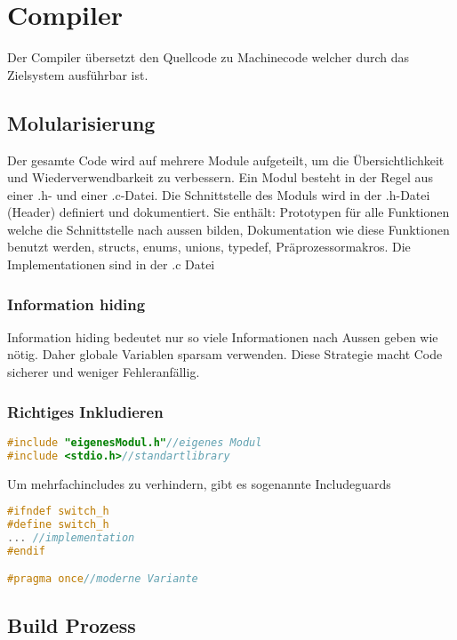 \section{Compiler}
Der Compiler übersetzt den Quellcode zu Machinecode welcher durch das Zielsystem ausführbar ist.
\subsection{Molularisierung}

Der gesamte Code wird auf mehrere Module aufgeteilt, um die Übersichtlichkeit und Wiederverwendbarkeit zu verbessern. Ein Modul besteht in der Regel aus einer .h- und einer .c-Datei.\newline
Die Schnittstelle des Moduls wird in der .h-Datei (Header) definiert und dokumentiert. Sie enthält: Prototypen für alle Funktionen welche die Schnittstelle nach aussen bilden, Dokumentation wie diese Funktionen benutzt werden, structs, enums, unions, typedef, Präprozessormakros. Die Implementationen sind in der .c Datei

\subsubsection{Information hiding}

Information hiding bedeutet nur so viele Informationen nach Aussen geben wie nötig. Daher globale Variablen sparsam verwenden. Diese Strategie macht Code sicherer und weniger Fehleranfällig.

\subsubsection{Richtiges Inkludieren}

\begin{lstlisting}[language = c]
#include "eigenesModul.h"//eigenes Modul
#include <stdio.h>//standartlibrary
\end{lstlisting}


Um mehrfachincludes zu verhindern, gibt es sogenannte Includeguards
\begin{lstlisting}[language = c]
#ifndef switch_h
#define switch_h
... //implementation
#endif

#pragma once//moderne Variante
\end{lstlisting}

\subsection{Build Prozess}

